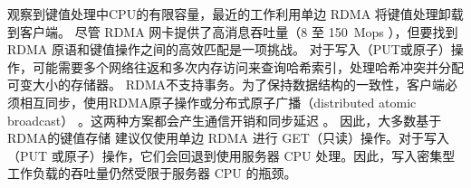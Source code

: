 观察到键值处理中CPU的有限容量，最近的工作利用单边 RDMA 将键值处理卸载到客户端。
尽管 RDMA 网卡提供了高消息吞吐量（8 至 150~Mops \cite {kalia2016design}），但要找到 RDMA 原语和键值操作之间的高效匹配是一项挑战。
对于写入（PUT或原子）操作，可能需要多个网络往返和多次内存访问来查询哈希索引，处理哈希冲突并分配可变大小的存储器。
RDMA不支持事务。为了保持数据结构的一致性，客户端必须相互同步，使用RDMA原子操作或分布式原子广播（distributed atomic broadcast） \cite{szepesi2014designing}。这两种方案都会产生通信开销和同步延迟 \cite {mitchell2013using,dragojevic2014farm}。
因此，大多数基于RDMA的键值存储 \cite {mitchell2013using,dragojevic2014farm,kalia2014using} 建议仅使用单边 RDMA 进行 GET（只读）操作。对于写入（PUT 或原子）操作，它们会回退到使用服务器 CPU 处理。因此，写入密集型工作负载的吞吐量仍然受限于服务器 CPU 的瓶颈。

\iffalse
\subsection{FPGA 可编程网卡}
\label{kvdirect:sec:programmable-nic}

十年前，处理器频率扩展速度放慢，人们转向多核和并发\cite {sutter2005free}。
如今，功率上限意味着多核扩展也遇到了困难\cite {esmaeilzadeh2013power}。
人们现在转向领域定制架构（DSA）以获得更好的性能。


由于网络速度和CPU网络处理能力的不匹配日益增加，带有FPGA的可编程网卡 \cite {vfp,greenberg2015sdn,li2016clicknp,caulfield2016cloud} 现在可以在数据中心进行大规模部署。
本文使用的可编程网卡的核心是FPGA，带有嵌入式网卡芯片以连接到网络。
可编程网卡通常带有板载DRAM作为数据包缓冲区和用于网卡固件的运行时内存\cite {li2016clicknp}，但DRAM通常不足以容纳整个键值存储。
\fi

